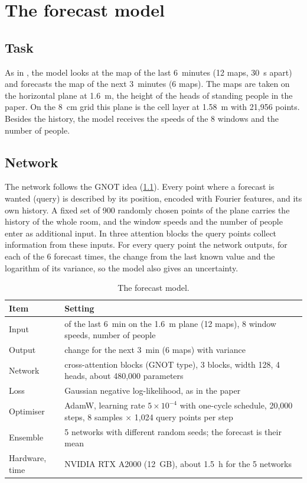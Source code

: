 \chapter{The forecast model}
\label{ch:model}

\section{Task}
As in \citet{bian2025}, the model looks at the \cotwo{} map of the last 6~minutes (12 maps, 30~s apart) and
forecasts the \cotwo{} map of the next 3~minutes (6 maps). The maps are taken on the horizontal plane at
1.6~m, the height of the heads of standing people in the paper. On the 8~cm grid this plane is the cell layer
at 1.58~m with 21,956 points. Besides the \cotwo{} history, the model receives the speeds of the 8 windows and
the number of people.

\section{Network}
The network follows the GNOT idea \citep{hao2023gnot} (\cref{tab:model}). Every point where a forecast is wanted
(query) is described by its position, encoded with Fourier features, and its own \cotwo{} history. A fixed set
of 900 randomly chosen points of the plane carries the \cotwo{} history of the whole room, and the window speeds
and the number of people enter as additional input. In three attention blocks the query points collect
information from these inputs. For every query point the network outputs, for each of the 6 forecast times,
the change from the last known \cotwo{} value and the logarithm of its variance, so the model also gives an
uncertainty.

\begin{table}[h]
  \centering
  \caption{The forecast model.}
  \label{tab:model}
  \begin{tabular}{>{\raggedright}p{4cm}p{9.7cm}}
    \toprule
    Item & Setting\\
    \midrule
    Input & \cotwo{} of the last 6~min on the 1.6~m plane (12 maps), 8 window speeds, number of people\\
    Output & \cotwo{} change for the next 3~min (6 maps) with variance\\
    Network & cross-attention blocks (GNOT type), 3 blocks, width 128, 4 heads, about 480,000 parameters\\
    Loss & Gaussian negative log-likelihood, as in the paper\\
    Optimiser & AdamW, learning rate $5\times10^{-4}$ with one-cycle schedule, 20,000 steps,
               8 samples $\times$ 1,024 query points per step\\
    Ensemble & 5 networks with different random seeds; the forecast is their mean\\
    Hardware, time & NVIDIA RTX A2000 (12~GB), about 1.5~h for the 5 networks\\
    \bottomrule
  \end{tabular}
\end{table}

